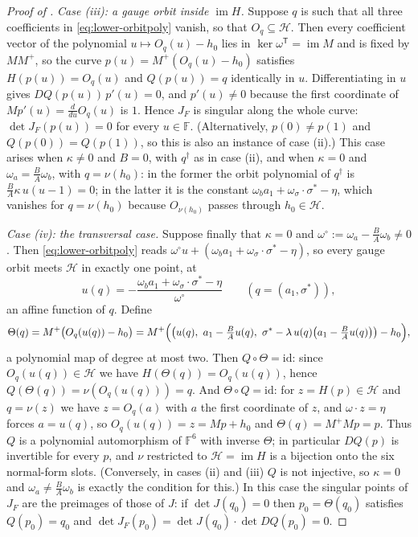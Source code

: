 \begin{proof}[Proof of ]
\smallskip
\noindent\textit{Case (iii): a gauge orbit inside $\operatorname{im}H$.}
Suppose $q$ is such that all three coefficients in \eqref{eq:lower-orbitpoly} vanish,
so that $O_q\subseteq\mathcal H$.  Then every coefficient vector of the polynomial
$u\mapsto O_q(u)-h_0$ lies in $\ker\omega^{\mathsf T}=\operatorname{im}M$ and is fixed
by $MM^+$, so the curve $p(u)=M^+(O_q(u)-h_0)$ satisfies $H(p(u))=O_q(u)$ and
$Q(p(u))=q$ identically in $u$.  Differentiating in $u$ gives $DQ(p(u))\,p'(u)=0$, and
$p'(u)\neq0$ because the first coordinate of $Mp'(u)=\frac{d}{du}O_q(u)$ is $1$.  Hence
$J_F$ is singular along the whole curve: $\det J_F(p(u))=0$ for every $u\in\mathbb{F}$.
(Alternatively, $p(0)\neq p(1)$ and $Q(p(0))=Q(p(1))$, so this is also an instance of
case (ii).)  This case arises when $\kappa\neq0$ and $B=0$, with $q^\dagger$ as in
case (ii), and when $\kappa=0$ and $\omega_a=\frac BA\omega_b$, with $q=\nu(h_0)$: in
the former the orbit polynomial of $q^\dagger$ is $\frac BA\kappa\,u(u-1)=0$; in the
latter it is the constant $\omega_ba_1+\omega_\sigma\cdot\sigma^*-\eta$, which vanishes
for $q=\nu(h_0)$ because $O_{\nu(h_0)}$ passes through $h_0\in\mathcal H$.

\smallskip
\noindent\textit{Case (iv): the transversal case.}
Suppose finally that $\kappa=0$ and $\omega^\circ:=\omega_a-\frac BA\omega_b\neq0$.
Then \eqref{eq:lower-orbitpoly} reads $\omega^\circ u+(\omega_ba_1+\omega_\sigma\cdot\sigma^*-\eta)$,
so every gauge orbit meets $\mathcal H$ in exactly one point, at
\[
   u(q)=-\frac{\omega_ba_1+\omega_\sigma\cdot\sigma^*-\eta}{\omega^\circ}\qquad(q=(a_1,\sigma^*)),
\]
an affine function of $q$.  Define
\[
   \Theta(q)=M^+\bigl(O_q(u(q))-h_0\bigr)
   =M^+\Bigl(\bigl(u(q),\ a_1-\tfrac BAu(q),\ \sigma^*-\lambda\,u(q)\bigl(a_1-\tfrac BAu(q)\bigr)\bigr)-h_0\Bigr),
\]
a polynomial map of degree at most two.  Then $Q\circ\Theta=\mathrm{id}$: since
$O_q(u(q))\in\mathcal H$ we have $H(\Theta(q))=O_q(u(q))$, hence
$Q(\Theta(q))=\nu(O_q(u(q)))=q$.  And $\Theta\circ Q=\mathrm{id}$: for $z=H(p)\in\mathcal H$
and $q=\nu(z)$ we have $z=O_q(a)$ with $a$ the first coordinate of $z$, and
$\omega\cdot z=\eta$ forces $a=u(q)$, so $O_q(u(q))=z=Mp+h_0$ and $\Theta(q)=M^+Mp=p$.
Thus $Q$ is a polynomial automorphism of $\mathbb{F}^6$ with inverse $\Theta$; in
particular $DQ(p)$ is invertible for every $p$, and $\nu$ restricted to
$\mathcal H=\operatorname{im}H$ is a bijection onto the six normal-form slots.
(Conversely, in cases (ii) and (iii) $Q$ is not injective, so $\kappa=0$ and
$\omega_a\neq\frac BA\omega_b$ is exactly the condition for this.)  In this case the
singular points of $J_F$ are the preimages of those of $J$: if $\det J(q_0)=0$ then
$p_0=\Theta(q_0)$ satisfies $Q(p_0)=q_0$ and
$\det J_F(p_0)=\det J(q_0)\cdot\det DQ(p_0)=0$.


\end{proof}

